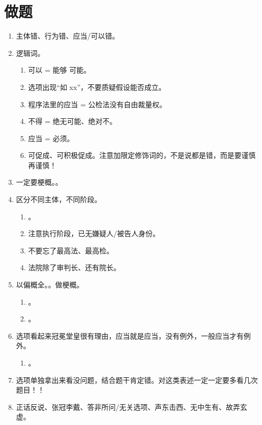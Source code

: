 \section{做题}
\begin{enumerate}
  \item 主体错、行为错、应当/可以错。
  \item 逻辑词。
        \begin{enumerate}
          \item 可以 = 能够 \bdy 可能。
          \item 选项出现“如 xx”，不要质疑假设能否成立。
          \item 程序法里的应当 = 公检法没有自由裁量权。
          \item 不得 = 绝无可能、绝对不。
          \item 应当 = 必须。
          \item 可促成、可积极促成。注意加限定修饰词的，不是说都是错，而是要谨慎再谨慎！
        \end{enumerate}
  \item 一定要梗概。。
  \item 区分不同主体，不同阶段。
        \begin{enumerate}
          \item {}。
          \item 注意执行阶段，已无嫌疑人/被告人身份。
          \item 不要忘了最高法、最高检。
          \item 法院除了审判长、还有院长。
        \end{enumerate}
  \item 以偏概全。。做梗概。
        \begin{enumerate}
          \item {}。
          \item {}。
        \end{enumerate}
  \item 选项看起来冠冕堂皇很有理由，应当就是应当，没有例外，一般应当才有例外。
        \begin{enumerate}
          \item {}。
        \end{enumerate}
  \item 选项单独拿出来看没问题，结合题干肯定错。对这类表述一定一定要多看几次题目！！
  \item 正话反说、张冠李戴、答非所问/无关选项、声东击西、无中生有、故弄玄虚。
\end{enumerate}
